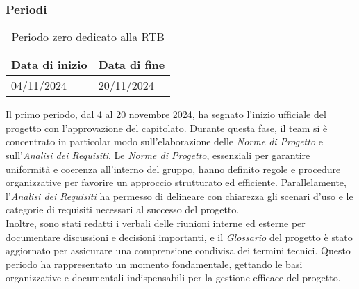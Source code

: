\subsubsection{Periodi}
\label{sec:periodi_RTB}


\begin{table}[h!]
    \centering
    \renewcommand{\arraystretch}{1.5} %
    \begin{tabularx}{\textwidth}{|X|X|}\hline
    \rowcolor[HTML]{FFD700} 
    \textbf{Data di inizio} & \textbf{Data di fine} \\ \hline
    04/11/2024 & 20/11/2024 \\ \hline
    \end{tabularx}
    \caption{Periodo zero dedicato alla RTB}
\end{table}
Il primo periodo, dal 4 al 20 novembre 2024, ha segnato l’inizio ufficiale del progetto con l’approvazione del capitolato. Durante questa fase, il team si è concentrato in particolar modo sull’elaborazione delle \textit{Norme di Progetto} e sull'\textit{Analisi dei Requisiti}. Le \textit{Norme di Progetto}, essenziali per garantire uniformità e coerenza all’interno del gruppo, hanno definito regole e procedure organizzative per favorire un approccio strutturato ed efficiente. Parallelamente, l’\textit{Analisi dei Requisiti} ha permesso di delineare con chiarezza gli scenari d’uso e le categorie di requisiti necessari al successo del progetto.\\
Inoltre, sono stati redatti i verbali delle riunioni interne ed esterne per documentare discussioni e decisioni importanti, e il \textit{Glossario} del progetto è stato aggiornato per assicurare una comprensione condivisa dei termini tecnici. Questo periodo ha rappresentato un momento fondamentale, gettando le basi organizzative e documentali indispensabili per la gestione efficace del progetto.

